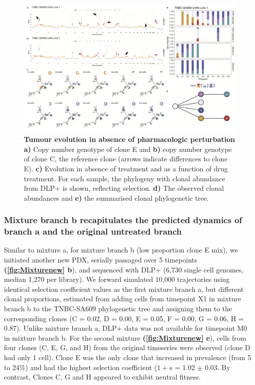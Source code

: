\begin{figure}
\centering
\includegraphics[width=\textwidth]{Figures/chap4/genePlotsa609mix.png}
	
\caption[Tumour evolution in absence of pharmacologic perturbation]
	{\small
	\textbf{Tumour evolution in absence of pharmacologic perturbation}
	    \textbf{a)} Copy number genotype of clone E and \textbf{b)} copy number genotype of clone C, the reference clone (arrows indicate differences to clone E).  
	    \textbf{c)} Evolution in absence of treatment and as a function of drug treatment. For each sample, the phylogeny with clonal abundance from DLP+ is shown, reflecting selection. \textbf{d)} The observed clonal abundances and \textbf{e)} the summarised clonal phylogenetic tree.}
	\label{fig:genotype609mix}
\end{figure}


\subsubsection{Mixture branch b recapitulates the predicted dynamics of branch a and the original untreated branch}

Similar to mixture a, for mixture branch b (low proportion clone E mix), we initiated another new PDX, serially passaged over 5 timepoints \textbf{(\autoref{fig:Mixturenew} b}), and sequenced with DLP+  (6,730 single cell genomes, median 1,270 per library).
We forward simulated 10,000 trajectories using identical selection coefficient values as the first mixture branch a, but different clonal proportions, estimated from adding cells from timepoint X1 in mixture branch b to the TNBC-SA609 phylogenetic tree and assigning them to the corresponding clones (C = 0.02, D = 0.00, E = 0.05, F = 0.00, G = 0.06, H = 0.87). Unlike mixture branch a, DLP+ data was not available for timepoint M0 in mixture branch b.
For the second mixture \textbf{(\autoref{fig:Mixturenew} e}), cells from four clones (C, E, G, and H) from the original timeseries were observed (clone D had only  1 cell). Clone E was the only clone that increased in prevalence (from 5 to 24\%) and had the highest selection coefficient ($1 + s$ = 1.02 $\pm$ 0.03.  By contrast, Clones C, G and H appeared to exhibit neutral fitness. 


